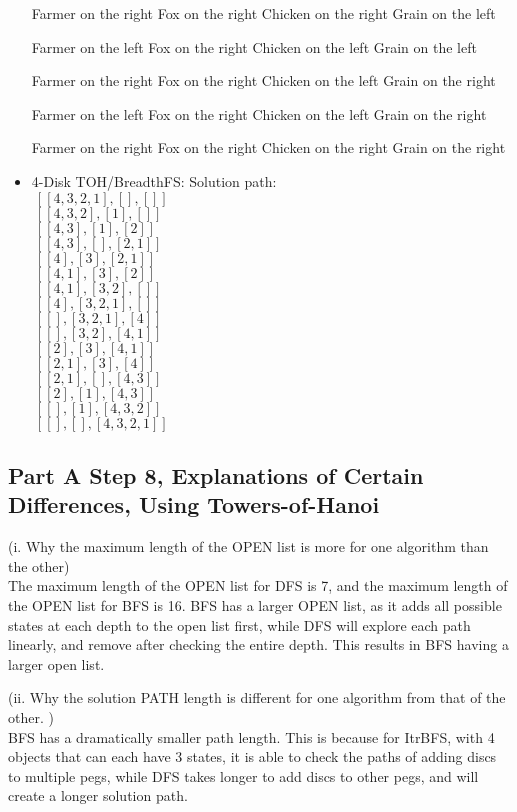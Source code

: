 \documentclass{article}
\begin{document}
\begin{itemize}
 Farmer on the right
 Fox on the right
 Chicken on the right
 Grain on the left

 Farmer on the left
 Fox on the right
 Chicken on the left
 Grain on the left

 Farmer on the right
 Fox on the right
 Chicken on the left
 Grain on the right

 Farmer on the left
 Fox on the right
 Chicken on the left
 Grain on the right

 Farmer on the right
 Fox on the right
 Chicken on the right
 Grain on the right
 \item 4-Disk TOH/BreadthFS:
 Solution path: 
\\ $\ [[4, 3, 2, 1] ,[] ,[]]$
\\ $\ [[4, 3, 2] ,[1] ,[]]$
\\ $\ [[4, 3] ,[1] ,[2]]$
\\ $\ [[4, 3] ,[] ,[2, 1]]$
\\ $\ [[4] ,[3] ,[2, 1]]$
\\ $\ [[4, 1] ,[3] ,[2]]$
\\ $\ [[4, 1] ,[3, 2] ,[]]$
\\ $\ [[4] ,[3, 2, 1] ,[]]$
\\ $\ [[] ,[3, 2, 1] ,[4]]$
\\ $\ [[] ,[3, 2] ,[4, 1]]$
\\ $\ [[2] ,[3] ,[4, 1]]$
\\ $\ [[2, 1] ,[3] ,[4]]$
\\ $\ [[2, 1] ,[] ,[4, 3]]$
\\ $\ [[2] ,[1] ,[4, 3]]$
\\ $\ [[] ,[1] ,[4, 3, 2]]$
\\ $\ [[] ,[] ,[4, 3, 2, 1]]$
 \end{itemize}

 \subsection{Part A Step 8,  Explanations of Certain Differences, Using Towers-of-Hanoi  }

\begin{paragraph}
(i. Why the maximum length of the OPEN list is more for one algorithm
than the other)
\\ The maximum length of the OPEN list for DFS is 7, and the maximum length of the OPEN list for BFS is 16. BFS has a larger OPEN list, as it adds all possible states at each depth to the open list first, while DFS will explore each path linearly, and remove after checking the entire depth. This results in BFS having a larger open list. 



\end{paragraph}
\begin{paragraph}
(ii. Why the solution PATH length is different for one algorithm from that of the other. )
\\ BFS has a dramatically smaller path length. This is because for ItrBFS, with 4 objects that can each have 3 states, it is able to check the paths of adding discs to multiple pegs, while DFS takes longer to add discs to other pegs, and will create a longer solution path. 

\end{paragraph}
\end{document}
